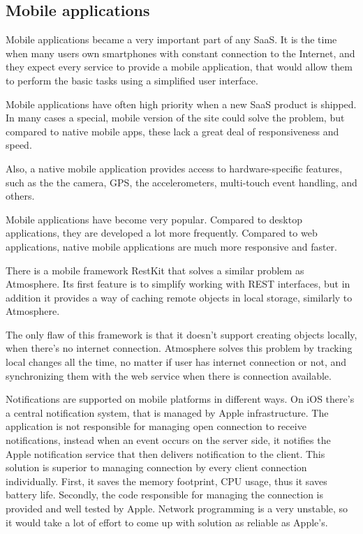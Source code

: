 \subsection{Mobile applications}

Mobile applications became a very important part of any SaaS. It is the time when many users own smartphones with constant connection to the Internet, and they expect every service to provide a mobile application, that would allow them to perform the basic tasks using a simplified user interface. \citep{facebook_stats}

Mobile applications have often high priority when a new SaaS product is shipped. In many cases a special, mobile version of the site could solve the problem, but compared to native mobile apps, these lack a great deal of responsiveness and speed.

Also, a native mobile application provides access to hardware-specific features, such as the the camera, GPS, the accelerometers, multi-touch event handling, and others.

Mobile applications have become very popular. \citep{facebook_stats} Compared to desktop applications, they are developed a lot more frequently. Compared to web applications, native mobile applications are much more responsive and faster.

There is a mobile framework RestKit \citep{restkit} that solves a similar problem as Atmosphere. Its first feature is to simplify working with REST interfaces, but in addition it provides a way of caching remote objects in local storage, similarly to Atmosphere.

The only flaw of this framework is that it doesn’t support creating objects locally, when there’s no internet connection. Atmosphere solves this problem by tracking local changes all the time, no matter if user has internet connection or not, and synchronizing them with the web service when there is connection available.

Notifications are supported on mobile platforms in different ways. On iOS there’s a central notification system, that is managed by Apple infrastructure. The application is not responsible for managing open connection to receive notifications, instead when an event occurs on the server side, it notifies the Apple notification service that then delivers notification to the client. This solution is superior to managing connection by every client connection individually. First, it saves the memory footprint, CPU usage, thus it saves battery life. Secondly, the code responsible for managing the connection is provided and well tested by Apple. Network programming is a very unstable, so it would take a lot of effort to come up with solution as reliable as Apple’s. 


